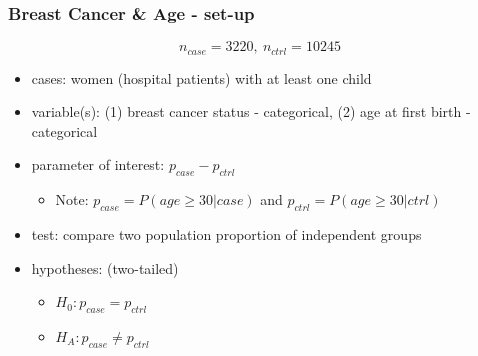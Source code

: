 \documentclass[11pt,containsverbatim,handout,xcolor=xelatex,dvipsnames,table]{beamer}
\begin{document}
\begin{frame}
\frametitle{Breast Cancer \& Age - set-up}

\vspace{-3mm}

\[ n_{case} = 3220,~n_{ctrl} = 10245 \]

\begin{itemize}
\item cases:  women (hospital patients) with at least one child
\item variable(s): \pause (1) breast cancer status - categorical, (2) age at first birth - categorical
\item parameter of interest: \pause $p_{case} - p_{ctrl}$
\begin{itemize}
\item  Note: $p_{case} = P(age \ge 30|case)$ and $p_{ctrl} = P(age \ge 30|ctrl)$
\end{itemize}
\item test: \pause compare two population proportion of independent groups
\item hypotheses: \pause (two-tailed)
\begin{itemize}
\item[] $H_0: p_{case}  =  p_{ctrl}$
\item[] $H_A: p_{case} \ne p_{ctrl}$
\end{itemize}
\end{itemize}

\end{frame}

\end{document}
